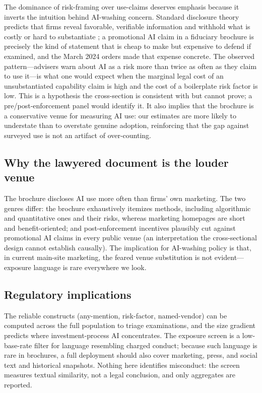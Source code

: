 \documentclass[utf8]{FrontiersinHarvard} %
\begin{document}
The dominance of risk-framing over use-claims deserves emphasis because it inverts the intuition behind AI-washing concern. Standard disclosure theory predicts that firms reveal favorable, verifiable information and withhold what is costly or hard to substantiate \citep{verrecchia2001,healy2001}; a promotional AI claim in a fiduciary brochure is precisely the kind of statement that is cheap to make but expensive to defend if examined, and the March 2024 orders made that expense concrete. The observed pattern---advisers warn about AI as a risk more than twice as often as they claim to use it---is what one would expect when the marginal legal cost of an unsubstantiated capability claim is high and the cost of a boilerplate risk factor is low. This is a hypothesis the cross-section is consistent with but cannot prove; a pre/post-enforcement panel would identify it. It also implies that the brochure is a conservative venue for measuring AI use: our estimates are more likely to understate than to overstate genuine adoption, reinforcing that the gap against surveyed use is not an artifact of over-counting.

\subsection{Why the lawyered document is the louder venue}
The brochure discloses AI use more often than firms' own marketing. The two genres differ: the brochure exhaustively itemizes methods, including algorithmic and quantitative ones and their risks, whereas marketing homepages are short and benefit-oriented; and post-enforcement incentives plausibly cut against promotional AI claims in every public venue (an interpretation the cross-sectional design cannot establish causally). The implication for AI-washing policy is that, in current main-site marketing, the feared venue substitution is not evident---exposure language is rare everywhere we look.

\subsection{Regulatory implications}
The reliable constructs (any-mention, risk-factor, named-vendor) can be computed across the full population to triage examinations, and the size gradient predicts where investment-process AI concentrates. The exposure screen is a low-base-rate filter for language resembling charged conduct; because such language is rare in brochures, a full deployment should also cover marketing, press, and social text and historical snapshots. Nothing here identifies misconduct: the screen measures textual similarity, not a legal conclusion, and only aggregates are reported.
\end{document}

